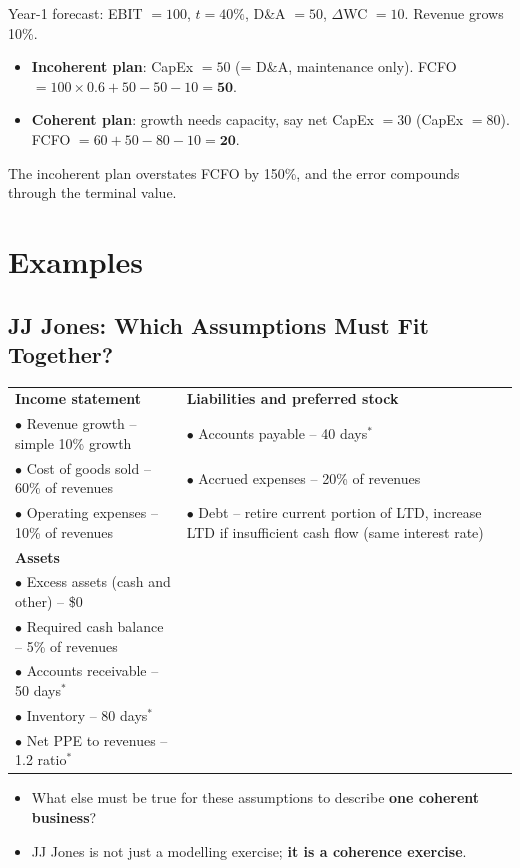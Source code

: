 \begin{exbox}
Year-1 forecast: EBIT $=100$, $t=40\%$, D\&A $=50$, $\Delta$WC $=10$. Revenue grows 10\%.
\begin{itemize}[leftmargin=*]
  \item \textbf{Incoherent plan}: CapEx $=50$ (= D\&A, maintenance only). FCFO $=100\times0.6+50-50-10=\mathbf{50}$.
  \item \textbf{Coherent plan}: growth needs capacity, say net CapEx $=30$ (CapEx $=80$). FCFO $=60+50-80-10=\mathbf{20}$.
\end{itemize}
The incoherent plan overstates FCFO by 150\%, and the error compounds through the terminal value.
\end{exbox}

\section{Examples}

\subsection{JJ Jones: Which Assumptions Must Fit Together?}

\begin{center}
\small
\begin{tabular}{@{}p{7cm}p{7cm}@{}}
\textbf{\color{keyred}Income statement} & \textbf{\color{keyred}Liabilities and preferred stock}\\
$\bullet$ Revenue growth -- simple 10\% growth & $\bullet$ Accounts payable -- 40 days$^*$\\
$\bullet$ Cost of goods sold -- 60\% of revenues & $\bullet$ Accrued expenses -- 20\% of revenues\\
$\bullet$ Operating expenses -- 10\% of revenues & $\bullet$ Debt -- retire current portion of LTD, increase LTD if insufficient cash flow (same interest rate)\\[4pt]
\textbf{\color{keyred}Assets} & \\
$\bullet$ Excess assets (cash and other) -- \$0 & \\
$\bullet$ Required cash balance -- 5\% of revenues & \\
$\bullet$ Accounts receivable -- 50 days$^*$ & \\
$\bullet$ Inventory -- 80 days$^*$ & \\
$\bullet$ Net PPE to revenues -- 1.2 ratio$^*$ & \\
\end{tabular}
\end{center}
\begin{itemize}
  \item What else must be true for these assumptions to describe \textbf{one coherent business}?
  \item JJ Jones is not just a modelling exercise; \textbf{it is a coherence exercise}.
\end{itemize}

